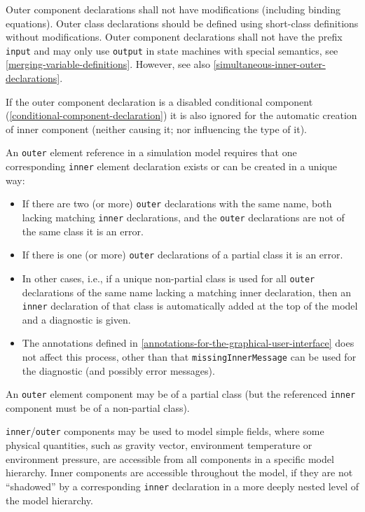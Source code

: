 Outer component declarations shall not have modifications (including binding equations).
Outer class declarations should be defined using short-class definitions without modifications.
Outer component declarations shall not have the prefix \lstinline!input! and may only use \lstinline!output! in state machines with special semantics, see \cref{merging-variable-definitions}.
However, see also \cref{simultaneous-inner-outer-declarations}.

If the outer component declaration is a disabled conditional component (\cref{conditional-component-declaration}) it is also ignored for the automatic creation of inner component (neither causing it; nor influencing the type of it).

An \lstinline!outer! element reference in a simulation model requires that one corresponding \lstinline!inner! element declaration exists or can be created in a unique way:
\begin{itemize}
\item
  If there are two (or more) \lstinline!outer! declarations with the same name, both lacking matching \lstinline!inner! declarations, and the \lstinline!outer! declarations are not of the same class it is an error.
\item
  If there is one (or more) \lstinline!outer! declarations of a partial class it is an error.
\item
  In other cases, i.e., if a unique non-partial class is used for all \lstinline!outer! declarations of the same name lacking a matching inner declaration, then an \lstinline!inner! declaration of that class is automatically added at the top of the model and a diagnostic is given.
\item
  The annotations defined in \cref{annotations-for-the-graphical-user-interface} does not affect this process, other than that \lstinline!missingInnerMessage! can be used for the diagnostic (and possibly error messages).
\end{itemize}

An \lstinline!outer! element component may be of a partial class (but the referenced \lstinline!inner! component must be of a non-partial class).

\begin{nonnormative}
\lstinline!inner!/\lstinline!outer! components may be used to model simple fields, where some physical quantities, such as gravity vector, environment temperature or environment pressure, are accessible from all components in a specific model hierarchy.
Inner components are accessible throughout the model, if they are not ``shadowed'' by a corresponding \lstinline!inner! declaration in a more deeply nested level of the model hierarchy.
\end{nonnormative}


